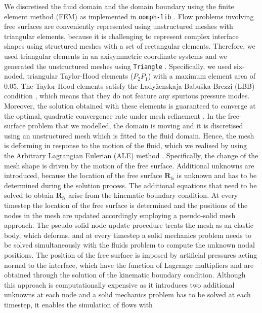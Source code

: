 \documentclass[aip,graphicx]{revtex4-1}
\newcommand{\sym}[1]{\text{#1}} \newcommand{\dif}{\mathrm{d}}
\newcommand{\vect}[1]{\bm{#1}}
\begin{document}
We discretised the fluid domain and the domain boundary using the
finite element method (FEM) as implemented in \texttt{oomph-lib}
\cite{HeilHazelOomph2006}.  Flow problems involving free surfaces are
conveniently represented using unstructured meshes with triangular
elements, because it is challenging to represent complex interface
shapes using structured meshes with a set of rectangular elements.
Therefore, we used triangular elements in an axisymmetric coordinate
systems and we generated the unstructured meshes using
\texttt{Triangle} \cite{shewchuk96b}.  Specifically, we used
six-noded, triangular Taylor-Hood \cite{taylor1973numerical} elements
($P_2 P_1$) with a maximum element area of 0.05.  The Taylor-Hood
elements satisfy the Lady\u{z}enskaja-Babu\u{s}ka-Brezzi (LBB)
condition \cite{sani2000incompressible}, which means that they do not
feature any spurious pressure modes.  Moreover, the solution obtained
with these elements is guaranteed to converge at the optimal,
quadratic convergence rate under mesh refinement
\cite{donea2003finite}.  In the free-surface problem that we modelled,
the domain is moving and it is discretised using an unstructured mesh
which is fitted to the fluid domain.  Hence, the mesh is deforming in
response to the motion of the fluid, which we realised by using the
Arbitrary Lagrangian Eulerian (ALE) method \cite{donea1982arbitrary}.
Specifically, the change of the mesh shape is driven by the motion of
the free surface.  Additional unknowns are introduced, because the
location of the free surface $\vect{R}_{\sym{fs}}$ is unknown and has
to be determined during the solution process.  The additional
equations that need to be solved to obtain $\vect{R}_{\sym{fs}}$ arise
from the kinematic boundary condition.  At every timestep the location
of the free surface is determined and the positions of the nodes in
the mesh are updated accordingly employing a pseudo-solid mesh
approach.  The pseudo-solid node-update procedure treats the mesh as
an elastic body, which deforms, and at every timestep a solid
mechanics problem needs to be solved simultaneously with the fluids
problem to compute the unknown nodal positions.  The position of the
free surface is imposed by artificial pressures acting normal to the
interface, which have the function of Lagrange multipliers and are
obtained through the solution of the kinematic boundary condition.
Although this approach is computationally expensive as it introduces
two additional unknowns at each node and a solid mechanics problem has
to be solved at each timestep, it enables the simulation of flows with
\end{document}
